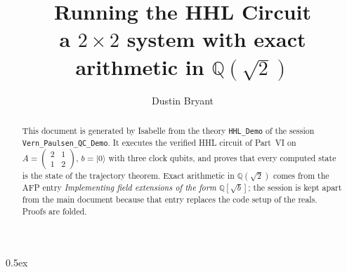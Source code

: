 \documentclass[11pt,a4paper]{article}
\newcommand{\ket}[1]{|#1\rangle}
\begin{document}
\title{Running the HHL Circuit\\[0.5em]
  \large a $2\times2$ system with exact arithmetic in $\mathbb Q(\sqrt2)$}
\author{Dustin Bryant}
\maketitle

\begin{abstract}
This document is generated by Isabelle from the theory \texttt{HHL\_Demo} of the session
\texttt{Vern\_Paulsen\_QC\_Demo}.  It executes the verified HHL circuit of Part~VI on
$A=\begin{pmatrix}2&1\\1&2\end{pmatrix}$, $b=\ket0$ with three clock qubits, and proves that
every computed state is the state of the trajectory theorem.  Exact arithmetic in
$\mathbb Q(\sqrt2)$ comes from the AFP entry \emph{Implementing field extensions of the form
$\mathbb Q[\sqrt b]$}; the session is kept apart from the main document because that entry
replaces the code setup of the reals.  Proofs are folded.
\end{abstract}

\parindent 0pt\parskip 0.5ex


\end{document}
